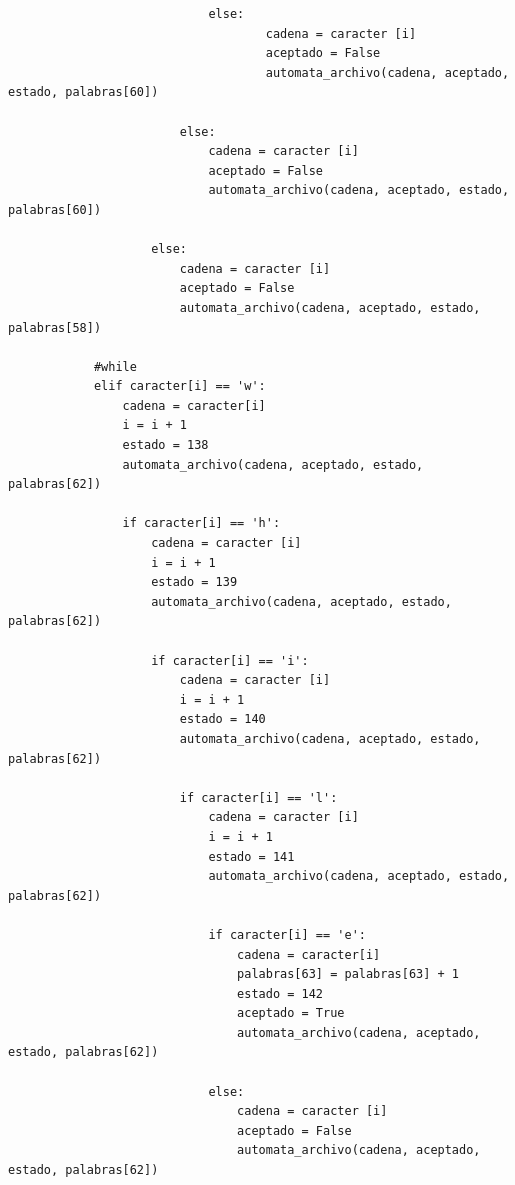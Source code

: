 \documentclass{article}
\begin{document}
\begin{flushleft}
\begin{lstlisting}
                            else:
                                    cadena = caracter [i]
                                    aceptado = False
                                    automata_archivo(cadena, aceptado, estado, palabras[60])           
                                    
                        else:
                            cadena = caracter [i]
                            aceptado = False
                            automata_archivo(cadena, aceptado, estado, palabras[60])
                         
                    else:
                        cadena = caracter [i]
                        aceptado = False
                        automata_archivo(cadena, aceptado, estado, palabras[58])
              
            #while
            elif caracter[i] == 'w':
                cadena = caracter[i]
                i = i + 1
                estado = 138
                automata_archivo(cadena, aceptado, estado, palabras[62])
                
                if caracter[i] == 'h':
                    cadena = caracter [i]
                    i = i + 1
                    estado = 139
                    automata_archivo(cadena, aceptado, estado, palabras[62])              
                    
                    if caracter[i] == 'i':
                        cadena = caracter [i]
                        i = i + 1
                        estado = 140
                        automata_archivo(cadena, aceptado, estado, palabras[62])
                        
                        if caracter[i] == 'l':
                            cadena = caracter [i]
                            i = i + 1
                            estado = 141
                            automata_archivo(cadena, aceptado, estado, palabras[62])
                            
                            if caracter[i] == 'e':
                                cadena = caracter[i]
                                palabras[63] = palabras[63] + 1
                                estado = 142
                                aceptado = True
                                automata_archivo(cadena, aceptado, estado, palabras[62])
                                
                            else:
                                cadena = caracter [i]
                                aceptado = False
                                automata_archivo(cadena, aceptado, estado, palabras[62])
                        

\end{lstlisting}
\end{flushleft}
\end{document}
